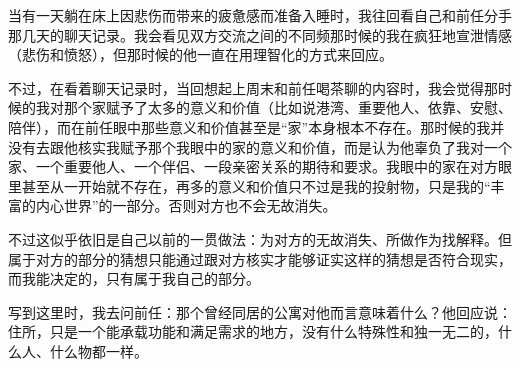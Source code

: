 当有一天躺在床上因悲伤而带来的疲惫感而准备入睡时，我往回看自己和前任分手那几天的聊天记录。我会看见双方交流之间的不同频\pozhehao{}那时候的我在疯狂地宣泄情感（悲伤和愤怒），但那时候的他一直在用理智化的方式来回应。

不过，在看着聊天记录时，当回想起上周末和前任喝茶聊的内容时，我会觉得那时候的我对那个家赋予了太多的意义和价值（比如说港湾、重要他人、依靠、安慰、陪伴），而在前任眼中那些意义和价值甚至是“家”本身根本不存在。那时候的我并没有去跟他核实我赋予那个我眼中的家的意义和价值，而是认为他辜负了我对一个家、一个重要他人、一个伴侣、一段亲密关系的期待和要求。我眼中的家在对方眼里甚至从一开始就不存在，再多的意义和价值只不过是我的投射物，只是我的“丰富的内心世界”的一部分。否则对方也不会无故消失。

不过这似乎依旧是自己以前的一贯做法：为对方的无故消失、所做作为找解释。但属于对方的部分的猜想只能通过跟对方核实才能够证实这样的猜想是否符合现实，而我能决定的，只有属于我自己的部分。

写到这里时，我去问前任：那个曾经同居的公寓对他而言意味着什么？他回应说：住所，只是一个能承载功能和满足需求的地方，没有什么特殊性和独一无二的，什么人、什么物都一样。

